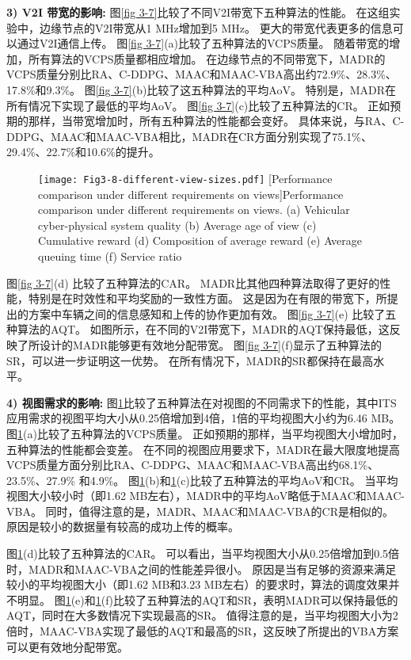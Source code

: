 \textbf{3) V2I 带宽的影响:}
图\ref{fig 3-7}比较了不同V2I带宽下五种算法的性能。
在这组实验中，边缘节点的V2I带宽从1 MHz增加到5 MHz。
更大的带宽代表更多的信息可以通过V2I通信上传。
图\ref{fig 3-7}(a)比较了五种算法的VCPS质量。
随着带宽的增加，所有算法的VCPS质量都相应增加。
在边缘节点的不同带宽下，MADR的VCPS质量分别比RA、C-DDPG、MAAC和MAAC-VBA高出约72.9\%、28.3\%、17.8\%和9.3\%。
图\ref{fig 3-7}(b)比较了这五种算法的平均AoV。
特别是，MADR在所有情况下实现了最低的平均AoV。
图\ref{fig 3-7}(c)比较了五种算法的CR。
正如预期的那样，当带宽增加时，所有五种算法的性能都会变好。
具体来说，与RA、C-DDPG、MAAC和MAAC-VBA相比，MADR在CR方面分别实现了75.1\%、29.4\%、22.7\%和10.6\%的提升。


\begin{figure}[h]
  \centering
  \texttt{[image: Fig3-8-different-view-sizes.pdf]}
  [Performance comparison under different requirements on views]{Performance comparison under different requirements on views. (a) Vehicular cyber-physical system quality (b) Average age of view (c) Cumulative reward (d) Composition of average reward (e) Average queuing time (f) Service ratio}
  \label{fig 3-8}
\end{figure}

图\ref{fig 3-7}(d) 比较了五种算法的CAR。
MADR比其他四种算法取得了更好的性能，特别是在时效性和平均奖励的一致性方面。
这是因为在有限的带宽下，所提出的方案中车辆之间的信息感知和上传的协作更加有效。
图\ref{fig 3-7}(e) 比较了五种算法的AQT。
如图所示，在不同的V2I带宽下，MADR的AQT保持最低，这反映了所设计的MADR能够更有效地分配带宽。
图\ref{fig 3-7}(f)显示了五种算法的SR，可以进一步证明这一优势。
在所有情况下，MADR的SR都保持在最高水平。

\textbf{4) 视图需求的影响:}
图\ref{fig 3-8}比较了五种算法在对视图的不同需求下的性能，其中ITS应用需求的视图平均大小从0.25倍增加到4倍，1倍的平均视图大小约为6.46 MB。
图\ref{fig 3-8}(a)比较了五种算法的VCPS质量。
正如预期的那样，当平均视图大小增加时，五种算法的性能都会变差。
在不同的视图应用要求下，MADR在最大限度地提高VCPS质量方面分别比RA、C-DDPG、MAAC和MAAC-VBA高出约68.1\%、23.5\%、27.9\% 和4.9\%。
图\ref{fig 3-8}(b)和\ref{fig 3-8}(c)比较了五种算法的平均AoV和CR。
当平均视图大小较小时（即1.62 MB左右），MADR中的平均AoV略低于MAAC和MAAC-VBA。
同时，值得注意的是，MADR、MAAC和MAAC-VBA的CR是相似的。
原因是较小的数据量有较高的成功上传的概率。

图\ref{fig 3-8}(d)比较了五种算法的CAR。
可以看出，当平均视图大小从0.25倍增加到0.5倍时，MADR和MAAC-VBA之间的性能差异很小。
原因是当有足够的资源来满足较小的平均视图大小（即1.62 MB和3.23 MB左右）的要求时，算法的调度效果并不明显。
图\ref{fig 3-8}(e)和\ref{fig 3-8}(f)比较了五种算法的AQT和SR，表明MADR可以保持最低的AQT，同时在大多数情况下实现最高的SR。
值得注意的是，当平均视图大小为2倍时，MAAC-VBA实现了最低的AQT和最高的SR，这反映了所提出的VBA方案可以更有效地分配带宽。

